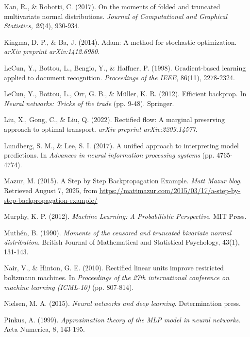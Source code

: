 \begin{thebibliography}{99}
Kan, R., \& Robotti, C. (2017). On the moments of folded and truncated multivariate normal distributions. \textit{Journal of Computational and Graphical Statistics, 26}(4), 930-934.

Kingma, D. P., \& Ba, J. (2014). Adam: A method for stochastic optimization. \textit{arXiv preprint arXiv:1412.6980}.

LeCun, Y., Bottou, L., Bengio, Y., \& Haffner, P. (1998). Gradient-based learning applied to document recognition. \textit{Proceedings of the IEEE}, 86(11), 2278-2324.

LeCun, Y., Bottou, L., Orr, G. B., \& Müller, K. R. (2012). Efficient backprop. In \textit{Neural networks: Tricks of the trade} (pp. 9-48). Springer.

Liu, X., Gong, C., \& Liu, Q. (2022). Rectified flow: A marginal preserving approach to optimal transport. \textit{arXiv preprint arXiv:2209.14577}.

Lundberg, S. M., \& Lee, S. I. (2017). A unified approach to interpreting model predictions. In \textit{Advances in neural information processing systems} (pp. 4765-4774).

Mazur, M. (2015). A Step by Step Backpropagation Example. \textit{Matt Mazur blog}. Retrieved August 7, 2025, from \url{https://mattmazur.com/2015/03/17/a-step-by-step-backpropagation-example/}

Murphy, K. P. (2012). \textit{Machine Learning: A Probabilistic Perspective}. MIT Press.

Muthén, B. (1990). \textit{Moments of the censored and truncated bivariate normal distribution}. British Journal of Mathematical and Statistical Psychology, 43(1), 131-143.

Nair, V., \& Hinton, G. E. (2010). Rectified linear units improve restricted boltzmann machines. In \textit{Proceedings of the 27th international conference on machine learning (ICML-10)} (pp. 807-814).

Nielsen, M. A. (2015). \textit{Neural networks and deep learning}. Determination press.

Pinkus, A. (1999). \textit{Approximation theory of the MLP model in neural networks}. Acta Numerica, 8, 143-195.


\end{thebibliography}
